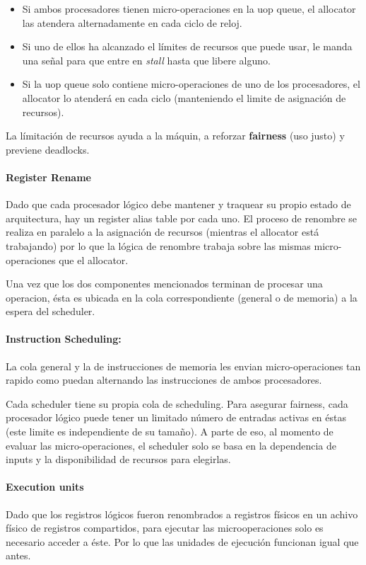 \begin{itemize}
	\item Si ambos procesadores tienen micro-operaciones en la uop queue, el allocator las atendera alternadamente en cada ciclo de reloj.
	\item Si uno de ellos ha alcanzado el límites de recursos que puede usar, le manda una señal para que entre en \textit{stall} hasta que libere alguno.
	\item Si la uop queue solo contiene micro-operaciones de uno de los procesadores, el allocator lo atenderá en cada ciclo (manteniendo el limite de asignación de recursos).
\end{itemize}
 
 La límitación de recursos ayuda a la máquin, a reforzar \textbf{fairness} (uso justo) y previene deadlocks. 
 
\paragraph{Register Rename}
Dado que cada procesador lógico debe mantener y traquear su propio estado de arquitectura, hay un register alias table por cada uno. El proceso de renombre se realiza en paralelo a la asignación de recursos (mientras el allocator está trabajando) por lo que la lógica de renombre trabaja sobre las mismas micro-operaciones que el allocator.

Una vez que los dos componentes mencionados terminan de procesar una operacion, ésta es ubicada en la cola correspondiente (general o de memoria) a la espera del scheduler.

\paragraph{Instruction Scheduling:} 
La cola general y la de instrucciones de memoria les envian micro-operaciones tan rapido como puedan alternando las instrucciones de ambos procesadores.

Cada scheduler tiene su propia cola de scheduling. Para  asegurar fairness, cada procesador lógico puede tener un limitado número de entradas activas en éstas (este limite es independiente de su tamaño). A parte de eso, al momento de evaluar las micro-operaciones, el scheduler solo se basa en la dependencia de inputs y la disponibilidad de recursos para elegirlas.

\paragraph{Execution units}
Dado que los registros lógicos fueron renombrados a registros físicos en un achivo físico de registros compartidos, para ejecutar las microoperaciones solo es necesario acceder a éste. Por lo que las unidades de ejecución funcionan igual que antes.

